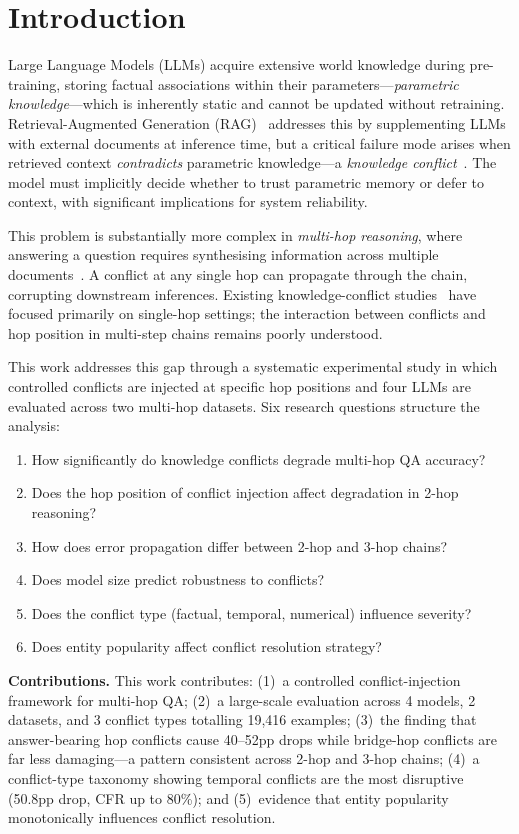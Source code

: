 \section{Introduction}
\label{sec:introduction}

Large Language Models (LLMs) acquire extensive world knowledge during pre-training, storing factual associations within their parameters---\emph{parametric knowledge}---which is inherently static and cannot be updated without retraining. Retrieval-Augmented Generation (RAG)~\citep{lewis2020retrieval,guu2020realm} addresses this by supplementing LLMs with external documents at inference time, but a critical failure mode arises when retrieved context \emph{contradicts} parametric knowledge---a \emph{knowledge conflict}~\citep{longpre2021entity,pan2023risk}. The model must implicitly decide whether to trust parametric memory or defer to context, with significant implications for system reliability.

This problem is substantially more complex in \emph{multi-hop reasoning}, where answering a question requires synthesising information across multiple documents~\citep{yang2018hotpotqa,trivedi2022musique}. A conflict at any single hop can propagate through the chain, corrupting downstream inferences. Existing knowledge-conflict studies~\citep{longpre2021entity,xie2024adaptive,chen2022rich} have focused primarily on single-hop settings; the interaction between conflicts and hop position in multi-step chains remains poorly understood.

This work addresses this gap through a systematic experimental study in which controlled conflicts are injected at specific hop positions and four LLMs are evaluated across two multi-hop datasets. Six research questions structure the analysis:

\begin{enumerate}
    \item[\textbf{RQ1}] How significantly do knowledge conflicts degrade multi-hop QA accuracy?
    \item[\textbf{RQ2}] Does the hop position of conflict injection affect degradation in 2-hop reasoning?
    \item[\textbf{RQ3}] How does error propagation differ between 2-hop and 3-hop chains?
    \item[\textbf{RQ4}] Does model size predict robustness to conflicts?
    \item[\textbf{RQ5}] Does the conflict type (factual, temporal, numerical) influence severity?
    \item[\textbf{RQ6}] Does entity popularity affect conflict resolution strategy?
\end{enumerate}

\noindent\textbf{Contributions.} This work contributes: (1)~a controlled conflict-injection framework for multi-hop QA; (2)~a large-scale evaluation across 4 models, 2 datasets, and 3 conflict types totalling 19,416 examples; (3)~the finding that answer-bearing hop conflicts cause 40--52pp drops while bridge-hop conflicts are far less damaging---a pattern consistent across 2-hop and 3-hop chains; (4)~a conflict-type taxonomy showing temporal conflicts are the most disruptive (50.8pp drop, CFR up to 80\%); and (5)~evidence that entity popularity monotonically influences conflict resolution.

